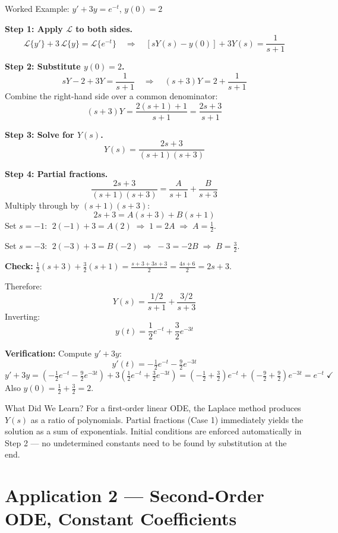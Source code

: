 \documentclass[12pt,a4paper]{article}
\begin{document}
\begin{infobox}{Worked Example: $y' + 3y = e^{-t}$, $y(0) = 2$}

\textbf{Step 1: Apply $\mathcal{L}$ to both sides.}
\[
\mathcal{L}\{y'\} + 3\,\mathcal{L}\{y\} = \mathcal{L}\{e^{-t}\}
\quad\Rightarrow\quad
[sY(s) - y(0)] + 3Y(s) = \frac{1}{s+1}
\]

\textbf{Step 2: Substitute $y(0) = 2$.}
\[
sY - 2 + 3Y = \frac{1}{s+1}
\quad\Rightarrow\quad
(s+3)Y = 2 + \frac{1}{s+1}
\]
Combine the right-hand side over a common denominator:
\[
(s+3)Y = \frac{2(s+1) + 1}{s+1} = \frac{2s + 3}{s+1}
\]

\textbf{Step 3: Solve for $Y(s)$.}
\[
Y(s) = \frac{2s+3}{(s+1)(s+3)}
\]

\textbf{Step 4: Partial fractions.}
\[
\frac{2s+3}{(s+1)(s+3)} = \frac{A}{s+1} + \frac{B}{s+3}
\]
Multiply through by $(s+1)(s+3)$:
\[
2s + 3 = A(s+3) + B(s+1)
\]
Set $s = -1$: $\;2(-1)+3 = A(2) \;\Rightarrow\; 1 = 2A \;\Rightarrow\; A = \tfrac{1}{2}$.

Set $s = -3$: $\;2(-3)+3 = B(-2) \;\Rightarrow\; -3 = -2B \;\Rightarrow\; B = \tfrac{3}{2}$.

\textbf{Check:} $\tfrac{1}{2}(s+3) + \tfrac{3}{2}(s+1) = \tfrac{s+3+3s+3}{2} = \tfrac{4s+6}{2} = 2s+3$. \checkmark

Therefore:
\[
Y(s) = \frac{1/2}{s+1} + \frac{3/2}{s+3}
\]
Inverting:
\[
\boxed{y(t) = \frac{1}{2}e^{-t} + \frac{3}{2}e^{-3t}}
\]

\textbf{Verification:} Compute $y' + 3y$:
\[
y'(t) = -\tfrac{1}{2}e^{-t} - \tfrac{9}{2}e^{-3t}
\]
\[
y' + 3y = \left(-\tfrac{1}{2}e^{-t} - \tfrac{9}{2}e^{-3t}\right) + 3\left(\tfrac{1}{2}e^{-t} + \tfrac{3}{2}e^{-3t}\right)
= \left(-\tfrac{1}{2}+\tfrac{3}{2}\right)e^{-t} + \left(-\tfrac{9}{2}+\tfrac{9}{2}\right)e^{-3t}
= e^{-t} \;\checkmark
\]
Also $y(0) = \tfrac{1}{2}+\tfrac{3}{2} = 2$. \checkmark
\end{infobox}

\begin{learnbox}{What Did We Learn?}
For a first-order linear ODE, the Laplace method produces $Y(s)$ as a ratio of
polynomials. Partial fractions (Case 1) immediately yields the solution as a sum of
exponentials. Initial conditions are enforced automatically in Step 2 --- no undetermined
constants need to be found by substitution at the end.
\end{learnbox}

\section{Application 2 --- Second-Order ODE, Constant Coefficients}
\end{document}

